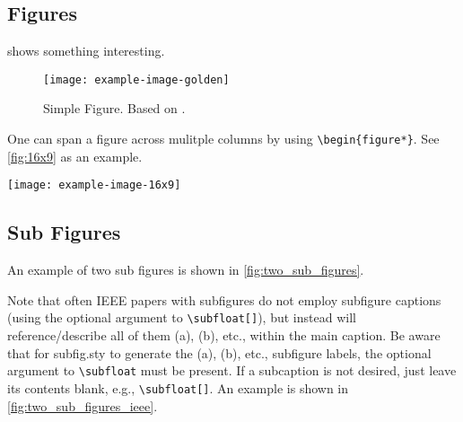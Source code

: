 \documentclass[conference,a4paper]{IEEEtran}[2015/08/26]
\begin{document}
\subsection{Figures}

\begin{ltgexample}
 shows something interesting.

\begin{figure}
  \centering
  \texttt{[image: example-image-golden]}
  \caption[Simple Figure]{Simple Figure. Based on \citet{mwe}.}
  \label{fig:label}
\end{figure}
\end{ltgexample}


One can span a figure across mulitple columns by using \verb+\begin{figure*}+.
See \cref{fig:16x9} as an example.

\begin{ltgexample}
\begin{figure*}
  \centering
  \texttt{[image: example-image-16x9]}
  \caption{16x9 Figure}
  \label{fig:16x9}
\end{figure*}
\end{ltgexample}


\subsection{Sub Figures}

An example of two sub figures is shown in \cref{fig:two_sub_figures}.

\begin{ltgexample}
\begin{figure*}[!b]
    \centering
  \hfil
  \caption{Example figure with two sub figures.}
  \label{fig:two_sub_figures}
\end{figure*}
\end{ltgexample}

Note that often IEEE papers with subfigures do not employ subfigure
captions (using the optional argument to \verb+\subfloat[]+), but instead will
reference/describe all of them (a), (b), etc., within the main caption.
Be aware that for subfig.sty to generate the (a), (b), etc., subfigure
labels, the optional argument to \verb+\subfloat+ must be present. If a
subcaption is not desired, just leave its contents blank,
e.g., \verb+\subfloat[]+.
An example is shown in \cref{fig:two_sub_figures_ieee}.
\end{document}
